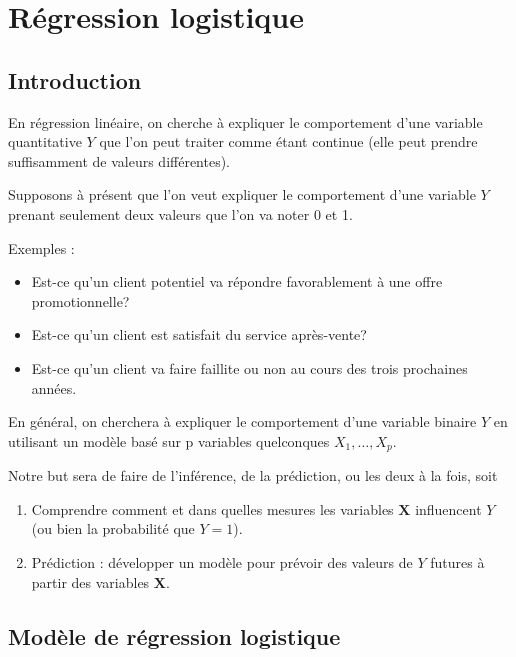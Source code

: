 \documentclass[
  11pt,
  letterpaper,
]{book}
\providecommand{\tightlist}{%
  \setlength{\itemsep}{0pt}\setlength{\parskip}{0pt}}
\theoremstyle{definition}
\theoremstyle{definition}
\theoremstyle{definition}
\theoremstyle{remark}
\begin{document}
\hypertarget{regression-logistique}{%
\chapter{Régression logistique}\label{regression-logistique}}

\hypertarget{introduction-4}{%
\section{Introduction}\label{introduction-4}}

En régression linéaire, on cherche à expliquer le comportement d'une variable quantitative \(Y\) que l'on peut traiter comme étant continue (elle peut prendre suffisamment de valeurs différentes).

Supposons à présent que l'on veut expliquer le comportement d'une variable \(Y\) prenant seulement deux valeurs que l'on va noter 0 et 1.

Exemples :

\begin{itemize}
\tightlist
\item
  Est-ce qu'un client potentiel va répondre favorablement à une offre promotionnelle?
\item
  Est-ce qu'un client est satisfait du service après-vente?
\item
  Est-ce qu'un client va faire faillite ou non au cours des trois prochaines années.
\end{itemize}

En général, on cherchera à expliquer le comportement d'une variable binaire \(Y\) en utilisant un modèle basé sur p variables quelconques \(X_1, \ldots, X_p\).

Notre but sera de faire de l'inférence, de la prédiction, ou les deux à la fois, soit

\begin{enumerate}
\def\labelenumi{\arabic{enumi})}
\tightlist
\item
  Comprendre comment et dans quelles mesures les variables \(\boldsymbol{X}\) influencent \(Y\) (ou bien la probabilité que \(Y=1\)).
\item
  Prédiction : développer un modèle pour prévoir des valeurs de \(Y\) futures à partir des variables \(\boldsymbol{X}\).
\end{enumerate}

\hypertarget{moduxe8le-de-ruxe9gression-logistique}{%
\section{Modèle de régression logistique}\label{moduxe8le-de-ruxe9gression-logistique}}
\end{document}
